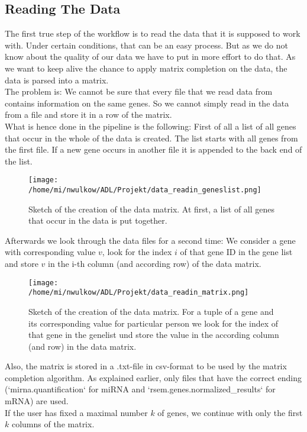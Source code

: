 \documentclass{bioinfo}
\begin{document}
\subsection{Reading The Data}
The first true step of the workflow is to read the data that it is supposed to work with. Under certain conditions, that can be an easy process. But as we do not know about the quality of our data we have to put in more effort to do that. As we want to keep alive the chance to apply matrix completion on the data, the data is parsed into a matrix.\\
The problem is: We cannot be sure that every file that we read data from contains information on the same genes. So we cannot simply read in the data from a file and store it in a row of the matrix.\\
What is hence done in the pipeline is the following: First of all a list of all genes that occur in the whole of the data is created. The list starts with all genes from the first file. If a new gene occurs in another file it is appended to the back end of the list.\\
\begin{figure}[!ht]
\centering
\texttt{[image: /home/mi/nwulkow/ADL/Projekt/data\_readin\_geneslist.png]}
\caption{Sketch of the creation of the data matrix. At first, a list of all genes that occur in the data is put together.}
\label{data_readin_geneslist}
\end{figure}

Afterwards we look through the data files for a second time: We consider a gene with corresponding value $v$, look for the index $i$ of that gene ID in the gene list and store $v$ in the i-th column (and according row) of the data matrix.\\
\begin{figure}[!ht]
\centering
\texttt{[image: /home/mi/nwulkow/ADL/Projekt/data\_readin\_matrix.png]}
\caption{Sketch of the creation of the data matrix. For a tuple of a gene and its corresponding value for particular person we look for the index of that gene in the genelist und store the value in the according column (and row) in the data matrix.}
\label{data_readin_matrix}
\end{figure}

Also, the matrix is stored in a .txt-file in csv-format to be used by the matrix completion algorithm. As explained earlier, only files that have the correct ending (`mirna.quantification` for miRNA and `rsem.genes.normalized\_results` for mRNA) are used.\\
If the user has fixed a maximal number $k$ of genes, we continue with only the first $k$ columns of the matrix.
\end{document}
